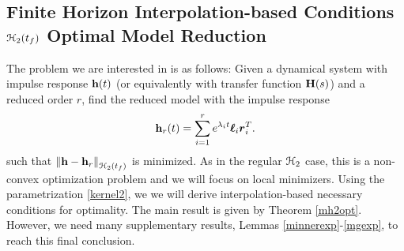 \documentclass[twocolumn]{autart}
\begin{document}
\subsection{Finite Horizon Interpolation-based Conditions $\EuScript{H}_2(t_f)$ Optimal Model Reduction}
The problem we are interested in is as follows: Given a dynamical system with impulse response $\mathbf{h}(t)$ (or equivalently with transfer function $\mathbf{H}(s)$) and a reduced order $r$, find the reduced model with the impulse response 
\begin{equation}\label{kernel2}
\begin{aligned}
\mathbf{h}_r(t)=\sum_{i=1}^r e^{\lambda_it}\boldsymbol{\ell}_i\boldsymbol{r}_i^T.
\end{aligned}
\end{equation}
such that $\left\lVert\mathbf{h} - \mathbf{h}_r\right\rVert_{\EuScript{H}_2(t_f)}$ is minimized. As in the regular $\EuScript{H}_2$ case, this is a non-convex optimization problem and we will focus on local minimizers. Using 
the parametrization \eqref{kernel2}, we we will derive interpolation-based necessary conditions for optimality.
The main result is given by Theorem \ref{mh2opt}. However, we  need many supplementary results, Lemmas 
\ref{minnerexp}-\ref{mgexp}, to reach this final conclusion. 
\end{document}
